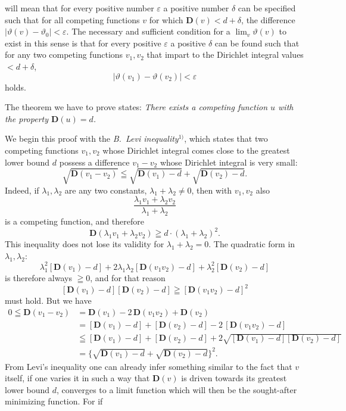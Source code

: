 \documentclass{article}
\begin{document}
will mean that for every positive number $\varepsilon$ a positive number $\delta$ can be specified such that for all competing functions $v$ for which $\mathbf{D}(v) < d + \delta$, the difference $|\vartheta(v) - \vartheta_0| < \varepsilon$. The necessary and sufficient condition for a $\lim_v \vartheta(v)$ to exist in this sense is that for every positive $\varepsilon$ a positive $\delta$ can be found such that for any two competing functions $v_1, v_2$ that impart to the Dirichlet integral values $< d + \delta$,
\[ |\vartheta(v_1) - \vartheta(v_2)| < \varepsilon \]
holds.

The theorem we have to prove states: \emph{There exists a competing function $u$ with the property $\mathbf{D}(u) = d$.}

We begin this proof with the \emph{B.~Levi inequality}${}^{1)}$, which states that two competing functions $v_1, v_2$ whose Dirichlet integral comes close to the greatest lower bound $d$ possess a difference $v_1 - v_2$ whose Dirichlet integral is very small:
\[ \sqrt{\mathbf{D}(v_1 - v_2)} \leqq \sqrt{\mathbf{D}(v_1) - d} + \sqrt{\mathbf{D}(v_2) - d}. \]
Indeed, if $\lambda_1, \lambda_2$ are any two constants, $\lambda_1 + \lambda_2 \neq 0$, then with $v_1, v_2$ also
\[ \frac{\lambda_1 v_1 + \lambda_2 v_2}{\lambda_1 + \lambda_2} \]
is a competing function, and therefore
\[ \mathbf{D}(\lambda_1 v_1 + \lambda_2 v_2) \geqq d \cdot (\lambda_1 + \lambda_2)^2. \]
This inequality does not lose its validity for $\lambda_1 + \lambda_2 = 0$. The quadratic form in $\lambda_1, \lambda_2$:
\[ \lambda_1^2 [\mathbf{D}(v_1) - d] + 2\lambda_1 \lambda_2 [\mathbf{D}(v_1 v_2) - d] + \lambda_2^2 [\mathbf{D}(v_2) - d] \]
is therefore always $\geqq 0$, and for that reason
\[ [\mathbf{D}(v_1) - d][\mathbf{D}(v_2) - d] \geqq [\mathbf{D}(v_1 v_2) - d]^2 \]
must hold. But we have
\[ \begin{aligned}
0 \leqq \mathbf{D}(v_1 - v_2) &= \mathbf{D}(v_1) - 2\,\mathbf{D}(v_1 v_2) + \mathbf{D}(v_2) \\
&= [\mathbf{D}(v_1) - d] + [\mathbf{D}(v_2) - d] - 2\,[\mathbf{D}(v_1 v_2) - d] \\
&\leqq [\mathbf{D}(v_1) - d] + [\mathbf{D}(v_2) - d] + 2\sqrt{[\mathbf{D}(v_1) - d][\mathbf{D}(v_2) - d]} \\
&= \bigl\{ \sqrt{\mathbf{D}(v_1) - d} + \sqrt{\mathbf{D}(v_2) - d} \bigr\}^2.
\end{aligned} \]
From Levi's inequality one can already infer something similar to the fact that $v$ itself, if one varies it in such a way that $\mathbf{D}(v)$ is driven towards its greatest lower bound $d$, converges to a limit function which will then be the sought-after minimizing function. For if
\end{document}
